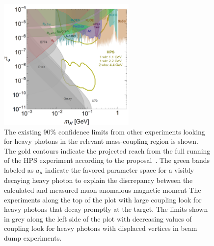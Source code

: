 \begin{figure}[H]
  \centering
      \includegraphics[width=0.6\textwidth]{pics/intro/projectedReach.png}
  \caption[Projected reach for the HPS experiment]{The existing 90$\%$ confidence limits from other experiments looking for heavy photons in the relevant mass-coupling region is shown. The gold contours indicate the projected reach from the full running of the HPS experiment according to the proposal~\cite{proposal}. The green bands labeled as $a_\mu$ indicate the favored parameter space for a visibly decaying heavy photon to explain the discrepancy between the calculated and measured muon anomalous magnetic moment The experiments along the top of the plot with large coupling look for heavy photons that decay promptly at the target. The limits shown in grey along the left side of the plot with decreasing values of coupling look for heavy photons with displaced vertices in beam dump experiments.}
  \label{Figure:projReach}
\end{figure}

